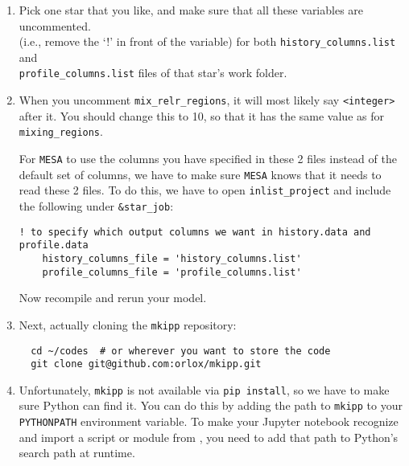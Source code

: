 \documentclass[11pt,a4paper]{article}
\begin{document}

\begin{enumerate}

  \item Pick one star that you like, and make sure that all these variables are uncommented. \\
   (i.e., remove the `!' in front of the variable) for both \texttt{history\_columns.list} and \\ 
   \texttt{profile\_columns.list} files of that star's work folder.
  \item 
When you uncomment \texttt{mix\_relr\_regions}, it will most likely say \texttt{<integer>} after it. You should change this to 10, so that it has the same value as for \texttt{mixing\_regions}.


For \texttt{MESA} to use the columns you have specified in these 2 files instead of the default set of columns, we have to make sure \texttt{MESA} knows that it needs to read these 2 files. To do this, we have to open \texttt{inlist\_project} and include the following under \texttt{\&star\_job}:
\begin{lstlisting}
! to specify which output columns we want in history.data and profile.data
    history_columns_file = 'history_columns.list'
    profile_columns_file = 'profile_columns.list'
\end{lstlisting}

Now recompile and rerun your model.



  \item Next, actually cloning the \texttt{mkipp} repository:

\begin{lstlisting}
  cd ~/codes  # or wherever you want to store the code
  git clone git@github.com:orlox/mkipp.git
\end{lstlisting}


  \item Unfortunately, \texttt{mkipp} is not available via \texttt{pip install}, so we have to make sure Python can find it. 
  You can do this by adding the path to \texttt{mkipp} to your \texttt{PYTHONPATH} environment variable. 
  To make your Jupyter notebook recognize and import a script or module from , you need to add that path to Python’s search path at runtime.


\end{enumerate}
\end{document}

